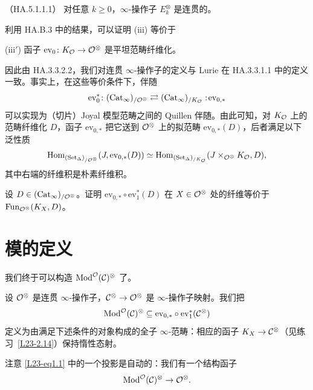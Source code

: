 \begin{theorem}\label{L23-2.12}（HA.5.1.1.1）
对任意 $k\ge0$，$\infty$-操作子 $E_{k}^{\otimes}$ 是连贯的。
\end{theorem}

\begin{remark}\label{L23-2.13}
利用 HA.B.3 中的结果，可以证明 (iii) 等价于
\par\noindent\hspace*{2.4em}(iii$'$) 函子 $\mathrm{ev}_{0}\colon K_{\mathcal{O}}\to\mathcal{O}^{\otimes}$ 是平坦范畴纤维化。
\par
因此由 HA.3.3.2.2，我们对连贯 $\infty$-操作子的定义与 Lurie 在 HA.3.3.1.1 中的定义一致。事实上，在这些等价条件下，伴随
\[
\mathrm{ev}_{0}^{*}\colon(\operatorname{Cat}_{\infty})_{/\mathcal{O}^{\otimes}}\rightleftarrows(\operatorname{Cat}_{\infty})_{/K_{\mathcal{O}}}:\!\mathrm{ev}_{0,*}
\]
可以实现为（切片）Joyal 模型范畴之间的 Quillen 伴随。由此可知，对 $K_{\mathcal{O}}$ 上的范畴纤维化 $D$，函子 $\mathrm{ev}_{0,*}$ 把它送到 $\mathcal{O}^{\otimes}$ 上的拟范畴 $\mathrm{ev}_{0,*}(D)$，后者满足以下泛性质
\[
\operatorname{Hom}_{(\operatorname{Set}_{\Delta})_{/\mathcal{O}^{\otimes}}}(J,\mathrm{ev}_{0,*}(D))
\simeq
\operatorname{Hom}_{(\operatorname{Set}_{\Delta})_{/K_{\mathcal{O}}}}(J\times_{\mathcal{O}^{\otimes}}K_{\mathcal{O}},D),
\]
其中右端的纤维积是朴素纤维积。
\end{remark}

\begin{exercise}\label{L23-2.14}
设 $D\in(\operatorname{Cat}_{\infty})_{/\mathcal{O}^{\otimes}}$。证明 $\mathrm{ev}_{0,*}\circ\mathrm{ev}_{1}^{*}(D)$ 在 $X\in\mathcal{O}^{\otimes}$ 处的纤维等价于 $\operatorname{Fun}_{\mathcal{O}^{\otimes}}(K_{X},D)$。
\end{exercise}

\section{模的定义}

\nitem\label{L23-3.1} 我们终于可以构造 $\operatorname{Mod}^{\mathcal{O}}(\mathcal{C})^{\otimes}$ 了。

\begin{definition}\label{L23-3.2}
设 $\mathcal{O}^{\otimes}$ 是连贯 $\infty$-操作子，$\mathcal{C}^{\otimes}\to\mathcal{O}^{\otimes}$ 是 $\infty$-操作子映射。我们把
\[
\operatorname{Mod}^{\mathcal{O}}(\mathcal{C})^{\otimes}\subseteq\mathrm{ev}_{0,*}\circ\mathrm{ev}_{1}^{*}(\mathcal{C}^{\otimes})
\]
定义为由满足下述条件的对象构成的全子 $\infty$-范畴：相应的函子 $K_{X}\to\mathcal{C}^{\otimes}$（见练习~\ref{L23-2.14}）保持惰性态射。
\end{definition}

\nitem\label{L23-3.3} 注意 \eqref{L23-eq1.1} 中的一个投影是自动的：我们有一个结构函子
\[
\operatorname{Mod}^{\mathcal{O}}(\mathcal{C})^{\otimes}\to\mathcal{O}^{\otimes}.
\]

